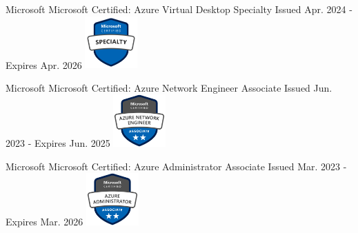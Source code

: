 \graphicspath{ {./images/} }




\begin{cventries}


\cventry
{Microsoft\vspace{2mm}} %
{Microsoft Certified: Azure Virtual Desktop Specialty} %
{} %
{Issued Apr. 2024 - Expires Apr. 2026} %
{ %
\includegraphics[height=2cm]{az-140}
}


\cventry
{Microsoft\vspace{2mm}} %
{Microsoft Certified: Azure Network Engineer Associate} %
{} %
{Issued Jun. 2023 - Expires Jun. 2025} %
{ %
\includegraphics[height=2cm]{az-700}
}


\cventry
{Microsoft\vspace{2mm}} %
{Microsoft Certified: Azure Administrator Associate} %
{} %
{Issued Mar. 2023 - Expires Mar. 2026} %
{ %
\includegraphics[height=2cm]{az-104}
}


\end{cventries}
